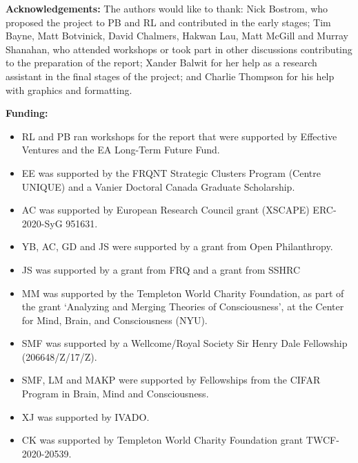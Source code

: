 \documentclass[12pt]{article}
\begin{document}
\smallskip

\noindent\textbf{Acknowledgements:} The authors would like to thank: Nick Bostrom, who proposed the project to PB and RL and contributed in the early stages; Tim Bayne, Matt Botvinick, David Chalmers, Hakwan Lau, Matt McGill and Murray Shanahan, who attended workshops or took part in other discussions contributing to the preparation of the report; Xander Balwit for her help as a research assistant in the final stages of the project; and Charlie Thompson for his help with graphics and formatting.

\smallskip

\noindent\textbf{Funding:} 
\begin{itemize}
\item RL and PB ran workshops for the report that were supported by Effective Ventures and the EA Long-Term Future Fund.
\item EE was supported by the FRQNT Strategic Clusters Program (Centre UNIQUE) and a Vanier Doctoral Canada Graduate Scholarship.
\item AC was supported by European Research Council grant (XSCAPE) ERC-2020-SyG 951631.
\item YB, AC, GD and JS were supported by a grant from Open Philanthropy.
\item JS was supported by a grant from FRQ and a grant from SSHRC
\item MM was supported by the Templeton World Charity Foundation, as part of the grant ‘Analyzing and Merging Theories of Consciousness’, at the Center for Mind, Brain, and Consciousness (NYU).
\item SMF was supported by a Wellcome/Royal Society Sir Henry Dale Fellowship (206648/Z/17/Z).
\item SMF, LM and MAKP were supported by Fellowships from the CIFAR Program in Brain, Mind and Consciousness.
\item XJ was supported by IVADO.
\item CK was supported by Templeton World Charity Foundation grant TWCF-2020-20539.
\end{itemize}

\smallskip


\newpage
\end{document}
